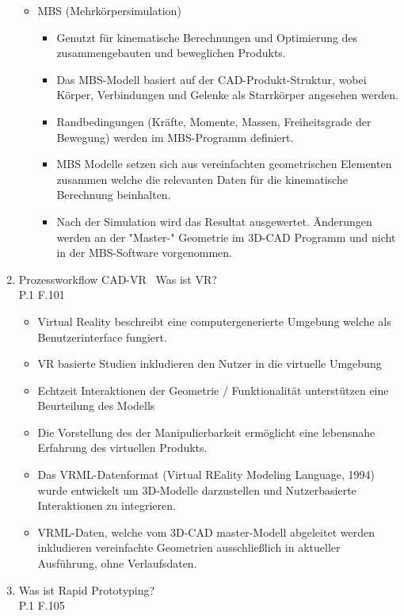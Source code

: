 \documentclass[10pt,a4paper,fleqn]{article}
\begin{document}
\begin{enumerate}
\begin{itemize}
				\item MBS (Mehrkörpersimulation)
					\begin{itemize}
						\item Genutzt für kinematische Berechnungen und Optimierung des zusammengebauten und beweglichen Produkts.
						\item Das MBS-Modell basiert auf der CAD-Produkt-Struktur, wobei Körper, Verbindungen und Gelenke als Starrkörper angesehen werden. 
						\item Randbedingungen (Kräfte, Momente, Massen, Freiheitsgrade der Bewegung) werden im MBS-Programm definiert.
						\item MBS Modelle setzen sich aus vereinfachten geometrischen Elementen zusammen welche die relevanten Daten für die kinematische Berechnung beinhalten.
						\item Nach der Simulation wird das Resultat ausgewertet. Änderungen werden an der "Master-" Geometrie im 3D-CAD Programm und nicht in der MBS-Software vorgenommen.
					\end{itemize}
			\end{itemize}
\pagebreak
	\item Prozessworkflow CAD-VR \ Was ist VR?\\
		P.1 F.101
		\begin{itemize}
			\item Virtual Reality beschreibt eine computergenerierte Umgebung welche als Benutzerinterface fungiert.
			\item VR basierte Studien inkludieren den Nutzer in die virtuelle Umgebung
			\item Echtzeit Interaktionen der Geometrie / Funktionalität unterstützen eine Beurteilung des Modells
			\item Die Vorstellung des der Manipulierbarkeit ermöglicht eine lebensnahe Erfahrung des virtuellen Produkts.
			\item Das VRML-Datenformat (Virtual REality Modeling Language, 1994) wurde entwickelt um 3D-Modelle darzustellen und Nutzerbasierte Interaktionen zu integrieren.
			\item VRML-Daten, welche vom 3D-CAD master-Modell abgeleitet werden inkludieren vereinfachte Geometrien ausschließlich in aktueller Ausführung, ohne Verlaufsdaten.
		\end{itemize}
	\item Was ist Rapid Prototyping?\\
		P.1 F.105

\end{enumerate}
\end{document}
